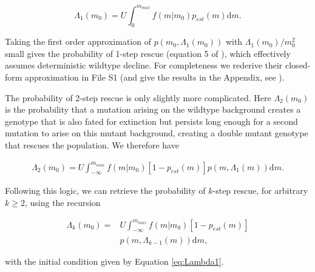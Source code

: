 \documentclass[9pt,twocolumn,twoside,lineno]{gsajnl}
\begin{document}
\begin{equation}\label{eq:Lambda1}
\Lambda_1(m_0) = U \int_0^{m_{max}} f(m|m_0) p_{est}(m) \mathrm{d}m.
\end{equation}

\noindent Taking the first order approximation of $p(m_0,\Lambda_1(m_0))$ with $\Lambda_1(m_0)/m_0^2$ small gives the probability of 1-step rescue (equation 5 of \citealp{Anciaux2018}), which effectively assumes deterministic wildtype decline.
For completeness we rederive their closed-form approximation in File S1 (and give the results in the Appendix, see ).

The probability of 2-step rescue is only slightly more complicated.
Here $\Lambda_2(m_0)$ is the probability that a mutation arising on the wildtype background creates a genotype that is also fated for extinction but persists long enough for a second mutation to arise on this mutant background, creating a double mutant genotype that rescues the population.
We therefore have

\begin{equation}\label{eq:Lambda2}
\begin{aligned}
\Lambda_2(m_0) = U \int_{-\infty}^{m_{max}} f(m|m_0) \left[ 1 - p_{est}(m) \right] p(m,\Lambda_{1}(m)) \mathrm{d}m.
\end{aligned}
\end{equation}

Following this logic, we can retrieve the probability of $k$-step rescue, for arbitrary $k\geq2$,  using the recursion

\begin{equation}\label{eq:Lambdak}
\begin{aligned}
\Lambda_k(m_0) =& U \int_{-\infty}^{m_{max}} f(m|m_0) \left[ 1 - p_{est}(m) \right] \\
                       & p(m,\Lambda_{k-1}(m)) \mathrm{d}m,
\end{aligned}
\end{equation}

\noindent with the initial condition given by Equation \ref{eq:Lambda1}.
\end{document}
